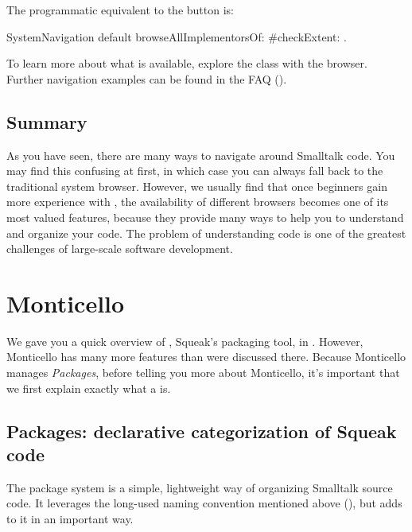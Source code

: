 \documentclass[a4paper,10pt,twoside]{book}
\begin{document}
The programmatic equivalent to the  button is:
\begin{code}{}
SystemNavigation default browseAllImplementorsOf: #checkExtent: .
\end{code}

To learn more about what is available, explore the class  with the browser.
Further navigation examples can be found in the FAQ ().


\subsection{Summary}

As you have seen, there are many ways to navigate around Smalltalk code. 
You may find this confusing at first, in which case you can always fall back to the traditional system browser.
However, we usually find that once beginners gain more experience with \sq, the availability of different browsers becomes one of its most valued features, because they provide many ways to help you to understand and organize your code.
The problem of understanding code is one of the greatest challenges of large-scale software development. 

\section{Monticello}

We gave you a quick overview of , Squeak's packaging tool, in .  
However, Monticello has many more features than were discussed there.  
Because Monticello manages \emph{Packages}, before telling you more about Monticello, it's important that we first explain exactly what a  is.

\subsection{Packages: declarative categorization of Squeak code}

The package system is a simple, lightweight way of organizing Smalltalk source code.
It leverages the long-used naming convention mentioned above (), but adds to it in an important way.
\end{document}
